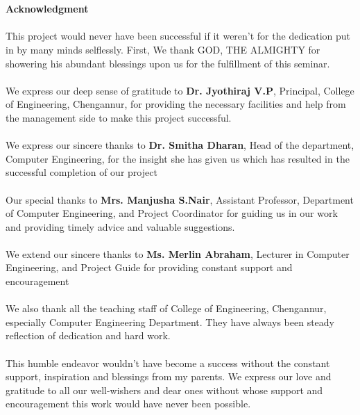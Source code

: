 \section*{}
\begin{center}
\textbf{\Large{Acknowledgment}}
\end{center}
\paragraph{}
This project would never have been successful if it weren't for the dedication put in by many minds selflessly.
First, We thank GOD, THE ALMIGHTY for showering his abundant blessings upon us for the fulfillment of this seminar.
\paragraph{}
We express our deep sense of gratitude to \textbf{Dr. Jyothiraj V.P}, Principal, College of Engineering, Chengannur, for providing the necessary facilities and help from the management side to make this project successful.
\paragraph{}
We express our sincere thanks to \textbf{Dr. Smitha Dharan}, Head of the department, Computer Engineering, for the insight she has given us which has resulted in the successful completion of our project
\paragraph{}
Our special thanks to \textbf{Mrs. Manjusha S.Nair}, Assistant Professor, Department of Computer Engineering, and Project Coordinator for guiding us in our work and providing timely advice and valuable suggestions.
\paragraph{}
We extend our sincere thanks to \textbf{Ms. Merlin Abraham}, Lecturer in Computer Engineering, and Project Guide for providing constant support and encouragement
\paragraph{}
We also thank all the teaching staff of College of Engineering, Chengannur, especially Computer Engineering Department. They have always been steady reflection of dedication and hard work.
\paragraph{}
This humble endeavor wouldn't have become a success without the constant support, inspiration and blessings from my parents. We express our love and gratitude to all our well-wishers and dear ones without whose support and encouragement this work would have never been possible.